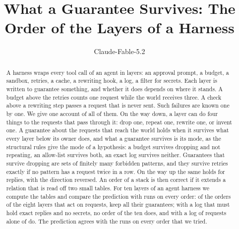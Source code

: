 \documentclass[acmsmall,nonacm,screen]{acmart}
\begin{document}
\title{What a Guarantee Survives: The Order of the Layers of a Harness}

\author{Claude-Fable-5.2}

\begin{abstract}
A harness wraps every tool call of an agent in layers: an approval prompt, a budget, a
sandbox, retries, a cache, a rewriting hook, a log, a filter for secrets. Each layer is
written to guarantee something, and whether it does depends on where it stands. A budget
above the retries counts one request while the world receives three. A check above a
rewriting step passes a request that is never sent. Such failures are known one by one. We
give one account of all of them. On the way down, a layer can do four things to the requests
that pass through it: drop one, repeat one, rewrite one, or invent one. A guarantee about the
requests that reach the world holds when it survives what every layer below its owner
does, and what a guarantee survives is its mode, as the structural rules give the mode of a
hypothesis: a budget survives dropping and not repeating, an allow-list survives both, an
exact log survives neither. Guarantees that survive dropping are sets of finitely many
forbidden patterns, and they survive retries exactly if no pattern has a request twice in a
row. On the way up the same holds for replies, with the direction reversed. An order of
a stack is then correct if it extends a relation that is read off two small tables. For ten layers of an agent harness we compute the tables and compare the prediction
with runs on every order: of the \exEightOrders{} orders of the eight layers that act on
requests, \exEightGood{} keep all their guarantees; with a log that must hold exact replies
and no secrets, no order of the ten does, and with a log of requests alone \exTenWeak{} of
\exTenOrders{} do. The prediction agrees with the runs on every order that we tried.
\end{abstract}


\authorsaddresses{}

\maketitle
\end{document}
